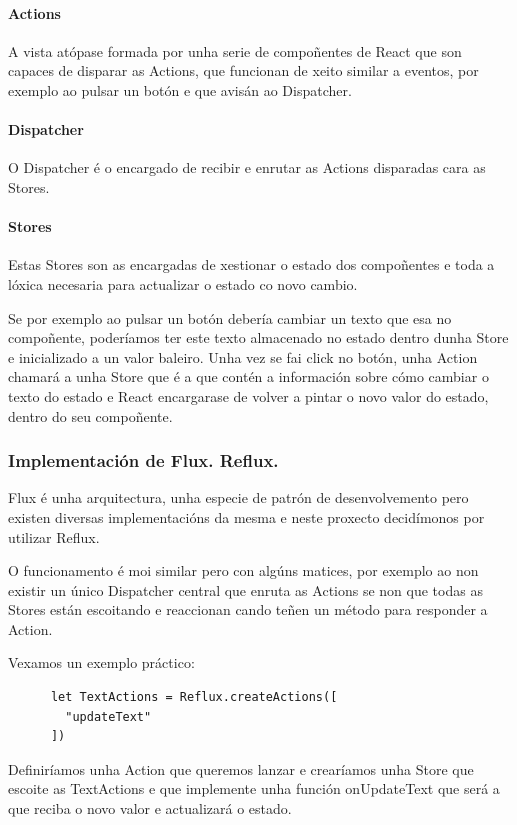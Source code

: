         \paragraph{Actions}
        A vista atópase formada por unha serie de compoñentes de React que son 
capaces de disparar as Actions, que funcionan de xeito similar a eventos, por 
exemplo ao pulsar un botón e que avisán ao Dispatcher.
        \paragraph{Dispatcher}
        O Dispatcher é o encargado de recibir e enrutar as Actions disparadas 
cara as Stores.
        \paragraph{Stores}
        Estas Stores son as encargadas de xestionar o estado dos compoñentes e 
toda a lóxica necesaria para actualizar o estado co novo cambio.

        Se por exemplo ao pulsar un botón debería cambiar un texto que esa no 
compoñente, poderíamos ter este texto almacenado no estado dentro dunha Store e 
inicializado a un valor baleiro.
        Unha vez se fai click no botón, unha Action chamará a unha Store que é 
a que contén a información sobre cómo cambiar o texto do estado e React 
encargarase de volver a pintar o novo valor do estado, dentro do seu compoñente.

      \subsubsection{Implementación de Flux. Reflux.}
      Flux é unha arquitectura, unha especie de patrón de desenvolvemento pero 
existen diversas implementacións da mesma e neste proxecto decidímonos por 
utilizar Reflux.

      O funcionamento é moi similar pero con algúns matices, por exemplo ao non 
existir un único Dispatcher central que enruta as Actions se non que todas as 
Stores están escoitando e reaccionan cando teñen un método para responder a 
Action.

     Vexamos un exemplo práctico:

     \begin{lstlisting}
      let TextActions = Reflux.createActions([
        "updateText"
      ])
    \end{lstlisting}

    Definiríamos unha Action que queremos lanzar e crearíamos unha Store que 
escoite as TextActions e que implemente unha función onUpdateText que será a 
que reciba o novo valor e actualizará o estado.

